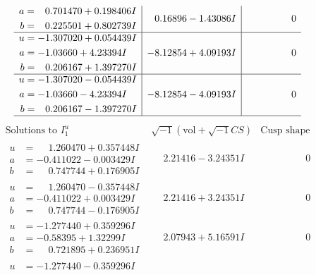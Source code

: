 \documentclass[1p]{elsarticle_modified}
\theoremstyle{definition}
\newcommand{\I}{\sqrt{-1}}
\begin{document}
$$\begin{array}{c|c|c}
\begin{aligned}
a &= \phantom{-}0.701470 + 0.198406 I \\
b &= \phantom{-}0.225501 + 0.802739 I\end{aligned}
 & \phantom{-}0.16896 - 1.43086 I & \phantom{-0.000000 } 0 \\ \hline\begin{aligned}
u &= -1.307020 + 0.054439 I \\
a &= -1.03660 + 4.23394 I \\
b &= \phantom{-}0.206167 + 1.397270 I\end{aligned}
 & -8.12854 + 4.09193 I & \phantom{-0.000000 } 0 \\ \hline\begin{aligned}
u &= -1.307020 - 0.054439 I \\
a &= -1.03660 - 4.23394 I \\
b &= \phantom{-}0.206167 - 1.397270 I\end{aligned}
 & -8.12854 - 4.09193 I & \phantom{-0.000000 } 0\\
 \hline 
 \end{array}$$\newpage$$\begin{array}{c|c|c}  
\text{Solutions to }I^u_{1}& \I (\text{vol} + \sqrt{-1}CS) & \text{Cusp shape}\\
 \hline 
\begin{aligned}
u &= \phantom{-}1.260470 + 0.357448 I \\
a &= -0.411022 - 0.003429 I \\
b &= \phantom{-}0.747744 + 0.176905 I\end{aligned}
 & \phantom{-}2.21416 - 3.24351 I & \phantom{-0.000000 } 0 \\ \hline\begin{aligned}
u &= \phantom{-}1.260470 - 0.357448 I \\
a &= -0.411022 + 0.003429 I \\
b &= \phantom{-}0.747744 - 0.176905 I\end{aligned}
 & \phantom{-}2.21416 + 3.24351 I & \phantom{-0.000000 } 0 \\ \hline\begin{aligned}
u &= -1.277440 + 0.359296 I \\
a &= -0.58395 + 1.32299 I \\
b &= \phantom{-}0.721895 + 0.236951 I\end{aligned}
 & \phantom{-}2.07943 + 5.16591 I & \phantom{-0.000000 } 0 \\ \hline\begin{aligned}
u &= -1.277440 - 0.359296 I \\

\end{aligned}
\end{array}$$
\end{document}
